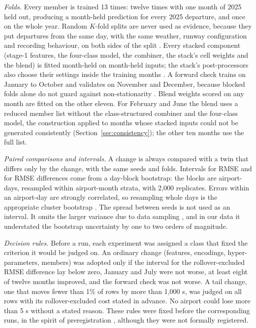 \documentclass[
  manuscript=article,  %
  layout=preprint,  %
  year=20xx,
  volume=x,
]{extra/joas}
\begin{document}
\textit{Folds.} Every member is trained 13 times: twelve times with one month of 2025 held out, producing a month-held prediction for every 2025 departure, and once on the whole year. Random $K$-fold splits are never used as evidence, because they put departures from the same day, with the same weather, runway configuration and recording behaviour, on both sides of the split \cite{roberts2017cross,bergmeir2018note,lones2024avoiding}. Every stacked component (stage-1 features, the four-class model, the combiner, the stack's cell weights and the blend) is fitted month-held on month-held inputs; the stack's post-processors also choose their settings inside the training months \cite{varma2006bias,cawley2010overfitting}. A forward check trains on January to October and validates on November and December, because blocked folds alone do not guard against non-stationarity \cite{arlot2010survey}. Blend weights scored on any month are fitted on the other eleven. For February and June the blend uses a reduced member list without the class-structured combiner and the four-class model, the construction applied to months whose stacked inputs could not be generated consistently (Section~\ref{sec:consistency}); the other ten months use the full list.

\textit{Paired comparisons and intervals.} A change is always compared with a twin that differs only by the change, with the same seeds and folds. Intervals for RMSE and for RMSE differences come from a day-block bootstrap: the blocks are airport-days, resampled within airport-month strata, with 2,000 replicates. Errors within an airport-day are strongly correlated, so resampling whole days is the appropriate cluster bootstrap \cite{field2007bootstrapping,cameron2008bootstrapbased}. The spread between seeds is not used as an interval. It omits the larger variance due to data sampling \cite{bouthillier2021accounting,nadeau2003inference}, and in our data it understated the bootstrap uncertainty by one to two orders of magnitude.

\textit{Decision rules.} Before a run, each experiment was assigned a class that fixed the criterion it would be judged on. An ordinary change (features, encodings, hyper-parameters, members) was adopted only if the interval for the rollover-excluded RMSE difference lay below zero, January and July were not worse, at least eight of twelve months improved, and the forward check was not worse. A tail change, one that moves fewer than 1\% of rows by more than 1,000 s, was judged on all rows with its rollover-excluded cost stated in advance. No airport could lose more than 5 s without a stated reason. These rules were fixed before the corresponding runs, in the spirit of preregistration \cite{nosek2018preregistration}, although they were not formally registered.
\end{document}
